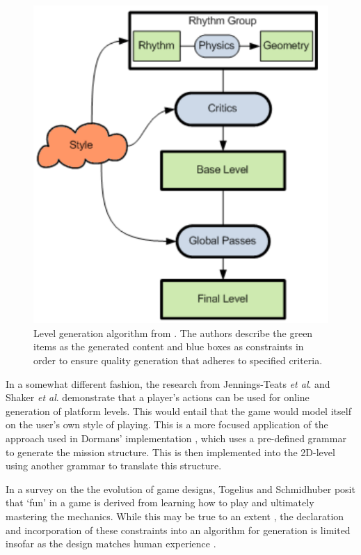 \documentclass[11pt, a4paper, oneside]{report} %
\begin{document}
\begin{figure}[h!]
  
  \centering     \includegraphics[scale=0.35]{lvlgen}      \caption{Level generation algorithm from
\cite{Smith:2009:RLG:1536513.1536548}. The authors describe the green items as the generated content
and blue boxes as constraints in order to ensure quality generation that adheres to specified
criteria.}  \label{level2} \end{figure}

In a somewhat different fashion, the research from Jennings-Teats \textit{et al}.
\cite{jennings2010polymorph} and Shaker \textit{et al}. \cite{shaker2010towards} demonstrate that a
player's actions can be used for online generation of platform levels. This would entail that the
game would model itself on the user's own style of playing. This is a more focused application of
the approach used in Dormans' implementation \cite{dormans2010adventures}, which uses a pre-defined
grammar to generate the mission structure. This is then implemented into the 2D-level using another
grammar to translate this structure.

In a survey on the the evolution of game designs, Togelius and Schmidhuber \cite{5035629} posit that
`fun' in a game is derived from learning how to play and ultimately mastering the mechanics. While
this may be true to an extent \cite{Burgun:2012}, the declaration and incorporation of these constraints into an
algorithm for generation is limited insofar as the design matches human experience
\cite{sorenson2011generic}. 
\end{document}
